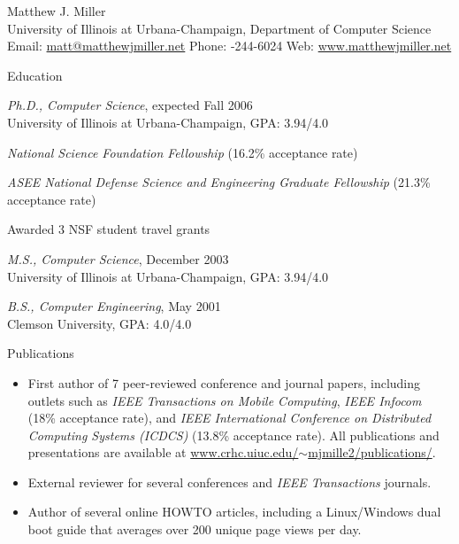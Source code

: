 \documentclass[10pt]{article}
\newenvironment{subbulletlist}{%
	\begin{list}{\labelitemii}{%
		\setlength{\topsep}{\itemsep}\setlength{\parskip}{\parsep}%
	}%
}%
{ \end{list} }
\begin{document}
\newlength{\oldcvlabelwidth}
\newlength{\oldcvlabelsep}

\begin{cv}{{\large Matthew J. Miller}\\
{\normalsize University of Illinois at Urbana-Champaign, 
Department of Computer Science\\
Email: {\mdseries \href{mailto:matt@matthewjmiller.net}
	{matt@matthewjmiller.net}} 
\hfill Phone: {-244-6024} \hfill 
Web: {\mdseries \href{http://www.matthewjmiller.net/}
	{www.matthewjmiller.net}}}
}

\setlength{\oldcvlabelwidth}{\cvlabelwidth}
\setlength{\oldcvlabelsep}{\cvlabelsep}

\setlength{\cvlabelwidth}{1em}

\begin{cvlist}{Education}
	\item \emph{Ph.D., Computer Science}, expected Fall 2006\\
	University of Illinois at Urbana-Champaign, GPA: 3.94/4.0
	\begin{subbulletlist}
		\item \emph{National Science Foundation Fellowship} 
		(16.2\% acceptance rate)
		\item \emph{ASEE National Defense Science and 
		Engineering Graduate Fellowship} (21.3\% acceptance rate)
		\item Awarded 3 NSF student travel grants
	\end{subbulletlist}
	\item \emph{M.S., Computer Science}, December 2003\\ 
	University of Illinois at Urbana-Champaign, GPA: 3.94/4.0
	\item \emph{B.S., Computer Engineering}, May 2001\\
	Clemson University, GPA: 4.0/4.0
\end{cvlist}

\setlength{\cvlabelwidth}{0em}
\setlength{\cvlabelsep}{\labelsep}
\begin{cvlist}{Publications}
\item
	\begin{itemize}\itemsep=0.25em
	\item First author of 7 peer-reviewed conference and journal
	papers, including outlets such as \textit{IEEE Transactions on
	Mobile Computing}, \textit{IEEE Infocom} (18\% acceptance rate),
	and \textit{IEEE International Conference on Distributed Computing
	Systems (ICDCS)} (13.8\% acceptance rate).  All publications and
	presentations are available at
	\href{http://www.crhc.uiuc.edu/~mjmille2/publications/}
	{www.crhc.uiuc.edu/$\sim$mjmille2/publications/}.
	\item External reviewer for several conferences and \textit{IEEE
	Transactions} journals.
	\item Author of several online HOWTO articles, including a
	Linux/Windows dual boot guide that averages over 200 unique page
	views per day.
	\end{itemize}
\end{cvlist}


\end{cv}
\end{document}

